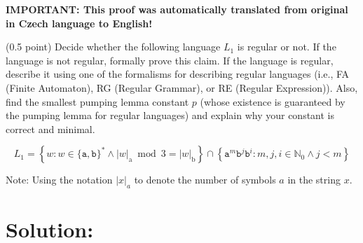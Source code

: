 \documentclass[10pt]{article}
\begin{document}
\noindent

\textbf{IMPORTANT: This proof was automatically translated from original in Czech language to English!}

\vskip 0.5cm

(0.5 point) Decide whether the following language $L_1$ is regular or not. If the language is not regular, formally prove this claim. If the language is regular, describe it using one of the formalisms for describing regular languages (i.e., FA (Finite Automaton), RG (Regular Grammar), or RE (Regular Expression)). Also, find the smallest pumping lemma constant $p$ (whose existence is guaranteed by the pumping lemma for regular languages) and explain why your constant is correct and minimal.

$$L_1=\left\{w: w \in\{\mathtt{a}, \mathtt{b}\}^{*} \wedge|w|_{\mathrm{a}} \bmod 3=|w|_{\mathrm{b}}\right\} \cap\left\{\mathtt{a}^{m} \mathtt{b}^{j} \mathtt{b}^{i}: m, j, i \in \mathbb{N}_{0} \wedge j<m\right\}$$

\noindent
Note: Using the notation $|x|_a$ to denote the number of symbols $a$ in the string $x$.

\section*{Solution:}
\end{document}
